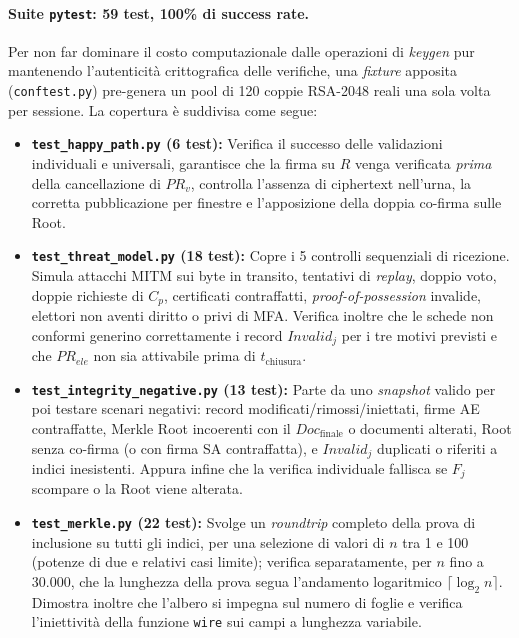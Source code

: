 \paragraph{Suite \texttt{pytest}: 59 test, 100\% di success rate.} 
Per non far dominare il costo computazionale dalle operazioni di \emph{keygen} pur mantenendo l'autenticità crittografica delle verifiche, una \emph{fixture} apposita (\texttt{conftest.py}) pre-genera un pool di 120 coppie RSA-2048 reali una sola volta per sessione. La copertura è suddivisa come segue:


\begin{itemize}
  \item \textbf{\texttt{test\_happy\_path.py} (6 test):} Verifica il successo delle validazioni individuali e universali, garantisce che la firma su $R$ venga verificata \emph{prima} della cancellazione di $PR_v$, controlla l'assenza di ciphertext nell'urna, la corretta pubblicazione per finestre e l'apposizione della doppia co-firma sulle Root.
  
  \item \textbf{\texttt{test\_threat\_model.py} (18 test):} Copre i 5 controlli sequenziali di ricezione. Simula attacchi MITM sui byte in transito, tentativi di \emph{replay}, doppio voto, doppie richieste di $C_p$, certificati contraffatti, \emph{proof-of-possession} invalide, elettori non aventi diritto o privi di MFA. Verifica inoltre che le schede non conformi generino correttamente i record $\mathit{Invalid}_j$ per i tre motivi previsti e che $PR_{ele}$ non sia attivabile prima di $t_{\text{chiusura}}$.
  
  \item \textbf{\texttt{test\_integrity\_negative.py} (13 test):} Parte da uno \emph{snapshot} valido per poi testare scenari negativi: record modificati/rimossi/iniettati, firme AE contraffatte, Merkle Root incoerenti con il $\mathit{Doc}_{\text{finale}}$ o documenti alterati, Root senza co-firma (o con firma SA contraffatta), e $\mathit{Invalid}_j$ duplicati o riferiti a indici inesistenti. Appura infine che la verifica individuale fallisca se $F_j$ scompare o la Root viene alterata.
  
  \item \textbf{\texttt{test\_merkle.py} (22 test):} Svolge un \emph{roundtrip} completo della prova di inclusione su tutti gli indici, per una selezione di valori di $n$ tra 1 e 100 (potenze di due e relativi casi limite); verifica separatamente, per $n$ fino a 30.000, che la lunghezza della prova segua l'andamento logaritmico $\lceil\log_2 n\rceil$. Dimostra inoltre che l'albero si impegna sul numero di foglie e verifica l'iniettività della funzione \texttt{wire} sui campi a lunghezza variabile.
\end{itemize}


